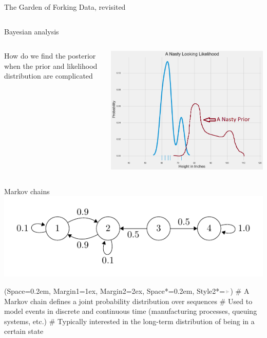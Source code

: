 \documentclass[12pt, aspectratio=149]{beamer}
\newcommand{\listSpace}{0.2em}
\theoremstyle{plain}
\begin{document}
\begin{frame}[fragile]{The Garden of Forking Data, revisited}
	\inputminted[fontsize=\tiny]{python}{../code/forking_data.py}
\end{frame}

\begin{frame}{Bayesian analysis}
\begin{columns}
\begin{column}{0.5\linewidth}
How do we find the posterior when the prior and likelihood distribution are complicated
\end{column}
\begin{column}{0.5\linewidth}
\includegraphics[scale=0.2]{figs/nasty_prior_posterior_example.png}
\end{column}
\end{columns}
\end{frame}

\begin{frame}[fragile]{Markov chains}
	\includegraphics[scale=.8]{figs/irreducible.pdf}
	\begin{easylist}
		\ListProperties(Space=\listSpace, Margin1=1ex, Margin2=2ex, Space*=\listSpace, Style2*=$\color{bggraydark}\blacktriangleright$\space)
		# A Markov chain defines a joint probability distribution over sequences
		# Used to model events in discrete and continuous time (manufacturing processes, queuing systems, etc.)
		# Typically interested in the long-term distribution of being in a certain state
	\end{easylist}
\end{frame}
\end{document}
